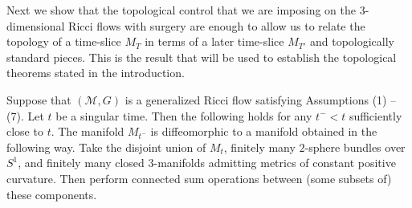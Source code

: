Next we show that the topological control that we are imposing on
the $3$-dimensional Ricci flows with surgery are enough to allow
us to relate the topology of a time-slice $M_T$ in terms of a later
time-slice $M_{T'}$ and topologically standard pieces. This is the
result that will be used to establish the topological theorems
stated in the introduction.


\begin{proposition}
\label{prop:surgery-topological-type}\label{surgerytoptype}
Suppose that $({\mathcal M},G)$ is a generalized Ricci flow satisfying Assumptions
(1) -- (7). Let $t$ be a singular time. Then the following holds
for any $t^-<t$ sufficiently close to $t$. The manifold $M_{t^-}$ is
diffeomorphic to a manifold obtained in the following way. Take the disjoint
union of $M_t$, finitely many $2$-sphere bundles over $S^1$, and finitely many
closed $3$-manifolds admitting  metrics of constant positive curvature. Then
perform connected sum operations between (some subsets of) these components.
\end{proposition}

